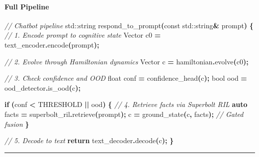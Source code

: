 \documentclass[
  11pt,
  a4paper,
]{article}
\newenvironment{Shaded}{\begin{snugshade}}{\end{snugshade}}
\newcommand{\AttributeTok}[1]{\textcolor[rgb]{0.13,0.29,0.53}{#1}}
\newcommand{\BuiltInTok}[1]{#1}
\newcommand{\CommentTok}[1]{\textcolor[rgb]{0.56,0.35,0.01}{\textit{#1}}}
\newcommand{\ControlFlowTok}[1]{\textcolor[rgb]{0.13,0.29,0.53}{\textbf{#1}}}
\newcommand{\DataTypeTok}[1]{\textcolor[rgb]{0.13,0.29,0.53}{#1}}
\newcommand{\KeywordTok}[1]{\textcolor[rgb]{0.13,0.29,0.53}{\textbf{#1}}}
\newcommand{\NormalTok}[1]{#1}
\newcommand{\OperatorTok}[1]{\textcolor[rgb]{0.81,0.36,0.00}{\textbf{#1}}}
\begin{document}
\paragraph{Full Pipeline}\label{full-pipeline}

\begin{Shaded}
\begin{Highlighting}[]
\CommentTok{// Chatbot pipeline}
\BuiltInTok{std::}\NormalTok{string respond\_to\_prompt}\OperatorTok{(}\AttributeTok{const} \BuiltInTok{std::}\NormalTok{string}\OperatorTok{\&}\NormalTok{ prompt}\OperatorTok{)} \OperatorTok{\{}
    \CommentTok{// 1. Encode prompt to cognitive state}
\NormalTok{    Vector c0 }\OperatorTok{=}\NormalTok{ text\_encoder}\OperatorTok{.}\NormalTok{encode}\OperatorTok{(}\NormalTok{prompt}\OperatorTok{);}
    
    \CommentTok{// 2. Evolve through Hamiltonian dynamics}
\NormalTok{    Vector c }\OperatorTok{=}\NormalTok{ hamiltonian}\OperatorTok{.}\NormalTok{evolve}\OperatorTok{(}\NormalTok{c0}\OperatorTok{);}
    
    \CommentTok{// 3. Check confidence and OOD}
    \DataTypeTok{float}\NormalTok{ conf }\OperatorTok{=}\NormalTok{ confidence\_head}\OperatorTok{(}\NormalTok{c}\OperatorTok{);}
    \DataTypeTok{bool}\NormalTok{ ood }\OperatorTok{=}\NormalTok{ ood\_detector}\OperatorTok{.}\NormalTok{is\_ood}\OperatorTok{(}\NormalTok{c}\OperatorTok{);}
    
    \ControlFlowTok{if} \OperatorTok{(}\NormalTok{conf }\OperatorTok{\textless{}}\NormalTok{ THRESHOLD }\OperatorTok{||}\NormalTok{ ood}\OperatorTok{)} \OperatorTok{\{}
        \CommentTok{// 4. Retrieve facts via Superbolt RIL}
        \KeywordTok{auto}\NormalTok{ facts }\OperatorTok{=}\NormalTok{ superbolt\_ril}\OperatorTok{.}\NormalTok{retrieve}\OperatorTok{(}\NormalTok{prompt}\OperatorTok{);}
\NormalTok{        c }\OperatorTok{=}\NormalTok{ ground\_state}\OperatorTok{(}\NormalTok{c}\OperatorTok{,}\NormalTok{ facts}\OperatorTok{);}  \CommentTok{// Gated fusion}
    \OperatorTok{\}}
    
    \CommentTok{// 5. Decode to text}
    \ControlFlowTok{return}\NormalTok{ text\_decoder}\OperatorTok{.}\NormalTok{decode}\OperatorTok{(}\NormalTok{c}\OperatorTok{);}
\OperatorTok{\}}
\end{Highlighting}
\end{Shaded}

\begin{center}\rule{0.5\linewidth}{0.5pt}\end{center}
\end{document}
